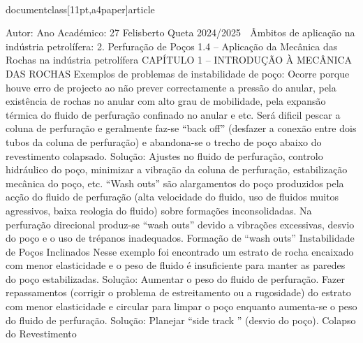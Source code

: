 \\documentclass[11pt,a4paper]{article}
\begin{document}
Autor:
Ano Académico:
27
Felisberto Queta
2024/2025

 Âmbitos de aplicação na indústria petrolífera:
2. Perfuração de Poços
1.4 – Aplicação da Mecânica das Rochas na indústria petrolífera
CAPÍTULO 1 
–
 INTRODUÇÃO À MECÂNICA DAS ROCHAS
Exemplos de problemas de instabilidade de poço:
Ocorre porque houve erro de projecto ao 
não prever correctamente a pressão do 
anular, pela existência de rochas no anular 
com alto grau de mobilidade, pela expansão 
térmica do fluido de perfuração confinado no 
anular e etc.
Será dificil pescar a coluna de perfuração e 
geralmente faz-se “back off” (desfazer a 
conexão entre dois tubos da coluna de 
perfuração) e abandona-se o trecho de poço 
abaixo do revestimento colapsado.
Solução: Ajustes no fluido de perfuração, 
controlo hidráulico do poço, minimizar a 
vibração da coluna de perfuração, 
estabilização mecânica do poço, etc.
“Wash outs” são alargamentos do poço 
produzidos pela acção do fluido de perfuração 
(alta velocidade do fluido, uso de fluidos 
muitos agressivos, baixa reologia do fluido) 
sobre formações inconsolidadas.
Na perfuração direcional produz-se “wash 
outs” devido a vibrações excessivas, desvio do 
poço e o uso de trépanos inadequados.
Formação de 
“wash outs”
Instabilidade de 
Poços Inclinados
Nesse exemplo foi encontrado um estrato de 
rocha encaixado com menor elasticidade e o 
peso de fluido é insuficiente para manter as 
paredes do poço estabilizadas.
Solução: Aumentar o peso do fluido de 
perfuração. Fazer repassamentos (corrigir o 
problema de estreitamento ou a rugosidade) do 
estrato com menor elasticidade e circular para 
limpar o poço enquanto aumenta-se o peso do 
fluido de perfuração.
Solução: Planejar “side track ” (desvio 
do poço).
Colapso do 
Revestimento\
\end{document}
